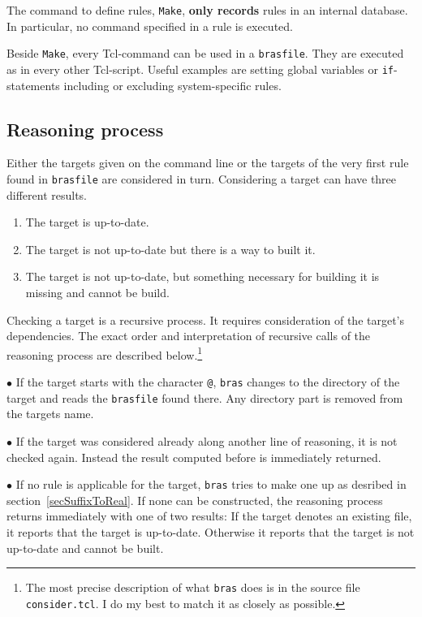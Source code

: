 \documentclass[11pt,bibtotoc,idxtotoc]{scrreprt}
\makeatletter
\newcommand{\bras}{\texttt{bras}}
\newcommand{\Indextt}[1]{\texttt{#1}\index{#1@\texttt{#1}}}
\makeatother
\begin{document}
The command to define rules, \texttt{Make}, \textbf{only records}
rules in an internal database. In particular, no command specified in
a rule is executed.

Beside \texttt{Make}, every Tcl-command can be used in a
\texttt{brasfile}. They are executed as in every other Tcl-script.
Useful examples are setting global variables or \texttt{if}-statements
including or excluding system-specific rules.

\subsection{Reasoning process}
\label{secReasoning}
Either the targets given on the command line or the targets of the
very first rule found in \texttt{brasfile} are considered in
turn. Considering a target can have three different results. 
\begin{enumerate}
\item
The target is up-to-date.
\item
The target is not up-to-date but there is a way to built it.
\item
The target is not up-to-date, but something necessary for building it
is missing and cannot be build.
\end{enumerate}
Checking a target is a recursive process. It requires consideration of
the target's dependencies. The exact order and interpretation of
recursive calls of the reasoning process are described
below.\footnote{The most precise description of what \bras{} does is
  in the source file \Indextt{consider.tcl}. I do my best to match it
  as closely as possible.}

$\bullet$ If the target starts with the character
\texttt{@}, \bras{} changes to the directory of the
target and reads the \texttt{brasfile} found there. Any directory part
is removed from the targets name.

$\bullet$ If the target was considered already along another line of
reasoning, it is not checked again. Instead the result computed before
is immediately returned.

$\bullet$ If no rule is applicable for the target, \bras{} tries to
make one up as desribed in section~\ref{secSuffixToReal}. If none can be
constructed, the reasoning process returns immediately with one of two
results: If the target denotes an existing file, it reports that the
target is up-to-date. Otherwise it reports that the target is not
up-to-date and cannot be built.
\end{document}
